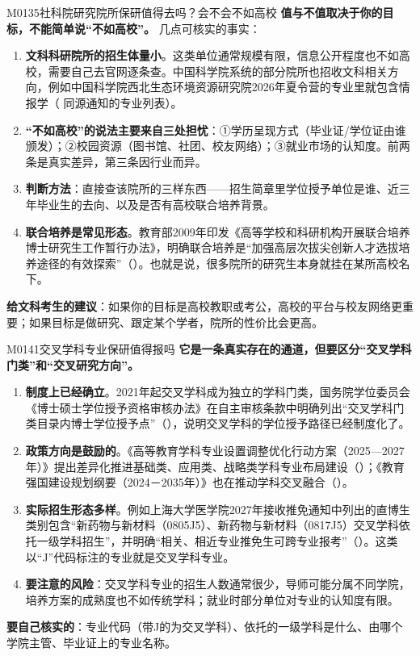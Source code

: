 \begin{qa}{M0135}{社科院研究院所保研值得去吗？会不会不如高校}
\textbf{值与不值取决于你的目标，不能简单说“不如高校”。}
几点可核实的事实：
\begin{enumerate}
  \item \textbf{文科科研院所的招生体量小}。这类单位通常规模有限，信息公开程度也不如高校，需要自己去官网逐条查。中国科学院系统的部分院所也招收文科相关方向，例如中国科学院西北生态环境资源研究院2026年夏令营的专业里就包含情报学（ 同源通知的专业列表）。
  \item \textbf{“不如高校”的说法主要来自三处担忧}：①学历呈现方式（毕业证/学位证由谁颁发）；②校园资源（图书馆、社团、校友网络）；③就业市场的认知度。前两条是真实差异，第三条因行业而异。
  \item \textbf{判断方法}：直接查该院所的三样东西——招生简章里学位授予单位是谁、近三年毕业生的去向、以及是否有高校联合培养背景。
  \item \textbf{联合培养是常见形态}。教育部2009年印发《高等学校和科研机构开展联合培养博士研究生工作暂行办法》，明确联合培养是“加强高层次拔尖创新人才选拔培养途径的有效探索”（）。也就是说，很多院所的研究生本身就挂在某所高校名下。
\end{enumerate}
\textbf{给文科考生的建议}：如果你的目标是高校教职或考公，高校的平台与校友网络更重要；如果目标是做研究、跟定某个学者，院所的性价比会更高。
\end{qa}

\begin{qa}{M0141}{交叉学科专业保研值得报吗}
\textbf{它是一条真实存在的通道，但要区分“交叉学科门类”和“交叉研究方向”。}
\begin{enumerate}
  \item \textbf{制度上已经确立}。2021年起交叉学科成为独立的学科门类，国务院学位委员会《博士硕士学位授予资格审核办法》在自主审核条款中明确列出“交叉学科门类目录内博士学位授予点”（），说明交叉学科的学位授予路径已经制度化了。
  \item \textbf{政策方向是鼓励的}。《高等教育学科专业设置调整优化行动方案（2025—2027年）》提出差异化推进基础类、应用类、战略类学科专业布局建设（）；《教育强国建设规划纲要（2024－2035年）》也在推动学科交叉融合（）。
  \item \textbf{实际招生形态多样}。例如上海大学医学院2027年接收推免通知中列出的直博生类别包含“新药物与新材料（0805J5）、新药物与新材料（0817J5）交叉学科依托一级学科招生”，并明确“相关、相近专业推免生可跨专业报考”（）。这类以“J”代码标注的专业就是交叉学科专业。
  \item \textbf{要注意的风险}：交叉学科专业的招生人数通常很少，导师可能分属不同学院，培养方案的成熟度也不如传统学科；就业时部分单位对专业的认知度有限。
\end{enumerate}
\textbf{要自己核实的}：专业代码（带J的为交叉学科）、依托的一级学科是什么、由哪个学院主管、毕业证上的专业名称。
\end{qa}

